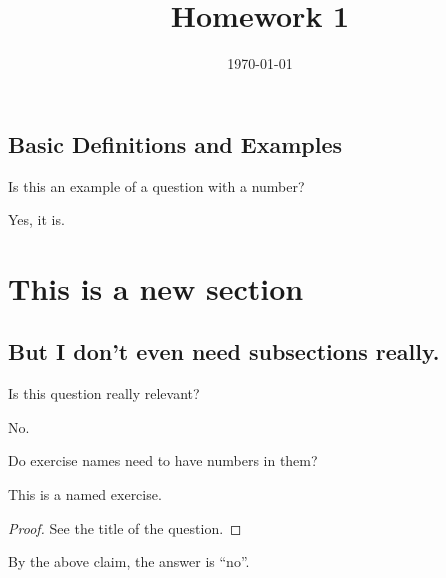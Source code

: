 \documentclass[220b]{homework}
\title{Homework 1}
\date{\today}
\begin{document}
\maketitle

\setcounter{section}{7}
\setcounter{subsection}{0}
\subsection{Basic Definitions and Examples}
\renewcommand{\writtensection}{7.1}

\setcounter{exerciseCounter}{6}
\begin{numedexercise}
    Is this an example of a question with a number?
    \begin{solution}
        Yes, it is.
    \end{solution}
\end{numedexercise}

\section{This is a new section}
\subsection{But I don't even need subsections really.}

\renewcommand{\writtensection}{New Section Name can be anything, even words. }
\setcounter{exerciseCounter}{-1}
\begin{numedexercise}
    Is this question really relevant?
    \begin{solution}
        No.
    \end{solution}
\end{numedexercise}

\begin{namedexercise}
    Do exercise names need to have numbers in them?
    \begin{solution}
        \begin{claim}
            This is a named exercise.
            \begin{proof}
                See the title of the question.
            \end{proof}
        \end{claim}
        By the above claim, the answer is ``no''.
    \end{solution}
\end{namedexercise}

\end{document}
